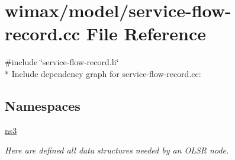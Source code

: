 \hypertarget{service-flow-record_8cc}{}\section{wimax/model/service-\/flow-\/record.cc File Reference}
\label{service-flow-record_8cc}
{\ttfamily \#include \char`\"{}service-\/flow-\/record.\+h\char`\"{}}\\*
Include dependency graph for service-\/flow-\/record.cc\+:
\subsection*{Namespaces}
\begin{DoxyCompactItemize}
\item 
 \hyperlink{namespacens3}{ns3}
\begin{DoxyCompactList}\small\item\em Here are defined all data structures needed by an O\+L\+SR node. \end{DoxyCompactList}\end{DoxyCompactItemize}
